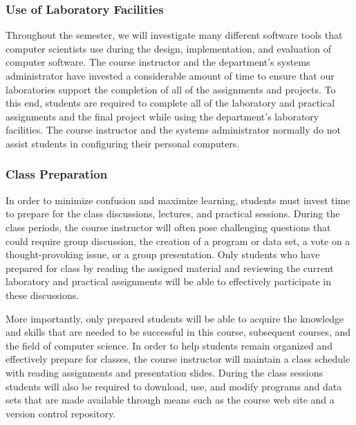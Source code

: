 \documentclass[11pt]{article}
\begin{document}
\subsubsection*{Use of Laboratory Facilities}

Throughout the semester, we will investigate many different software tools that computer scientists use during the
design, implementation, and evaluation of computer software.  The course instructor and the department's systems
administrator have invested a considerable amount of time to ensure that our laboratories support the completion of all
of the assignments and projects.  To this end, students are required to complete all of the laboratory and practical
assignments and the final project while using the department's laboratory facilities. The course instructor and the
systems administrator normally do not assist students in configuring their personal computers.

\subsubsection*{Class Preparation}


In order to minimize confusion and maximize learning, students must invest time to prepare for the class discussions,
lectures, and practical sessions.  During the class periods, the course instructor will often pose challenging questions
that could require group discussion, the creation of a program or data set, a vote on a thought-provoking issue, or a
group presentation.  Only students who have prepared for class by reading the assigned material and reviewing the
current laboratory and practical assignments will be able to effectively participate in these discussions.

More importantly, only prepared students will be able to acquire the knowledge and skills that are needed to be
successful in this course, subsequent courses, and the field of computer science.  In order to help students remain
organized and effectively prepare for classes, the course instructor will maintain a class schedule with reading
assignments and presentation slides.   During the class sessions students will also be required to download, use, and
modify programs and data sets that are made available through means such as the course web site and a version control
repository.
\end{document}

